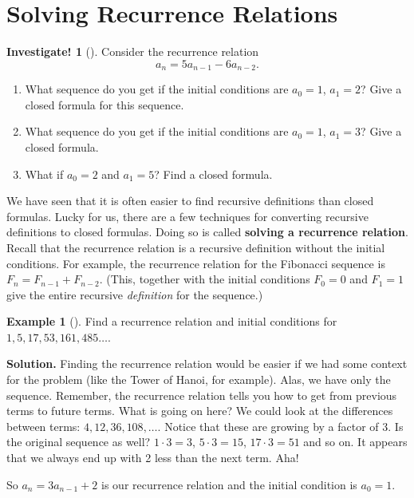\documentclass[12pt,]{book}
\newcommand{\terminology}[1]{\textbf{#1}}
\theoremstyle{plain}
\theoremstyle{definition}
\theoremstyle{definition}
\newtheorem{example}[theorem]{Example}
\theoremstyle{definition}
\newtheorem{investigation}[project]{Investigate!}
\numberwithin{equation}{chapter}
\begin{document}
\section[{Solving Recurrence Relations}]{Solving Recurrence Relations}\label{sec_recurrence}
\begin{investigation}[]\label{investigation-7}
\hypertarget{p-283}{}%
Consider the recurrence relation%
\begin{equation*}
a_n = 5a_{n-1} - 6a_{n-2}.
\end{equation*}
%
\begin{enumerate}
\item\hypertarget{li-177}{}\hypertarget{p-284}{}%
What sequence do you get if the initial conditions are \(a_0 = 1\), \(a_1 = 2\)? Give a closed formula for this sequence.%
\item\hypertarget{li-178}{}\hypertarget{p-285}{}%
What sequence do you get if the initial conditions are \(a_0 = 1\), \(a_1 = 3\)? Give a closed formula.%
\item\hypertarget{li-179}{}\hypertarget{p-286}{}%
What if \(a_0 = 2\) and \(a_1 = 5\)? Find a closed formula.%
\end{enumerate}
%
\end{investigation}
\hypertarget{p-287}{}%
We have seen that it is often easier to find recursive definitions than closed formulas. Lucky for us, there are a few techniques for converting recursive definitions to closed formulas. Doing so is called \terminology{solving a recurrence relation}. Recall that the recurrence relation is a recursive definition without the initial conditions. For example, the recurrence relation for the Fibonacci sequence is \(F_n = F_{n-1} + F_{n-2}\). (This, together with the initial conditions \(F_0 = 0\) and \(F_1 = 1\) give the entire recursive \emph{definition} for the sequence.)%
\begin{example}[]\label{example-18}
\hypertarget{p-288}{}%
Find a recurrence relation and initial conditions for \(1, 5, 17, 53, 161, 485\ldots\).%
\par\smallskip%
\noindent\textbf{Solution.}\hypertarget{solution-32}{}\quad%
\hypertarget{p-289}{}%
Finding the recurrence relation would be easier if we had some context for the problem (like the Tower of Hanoi, for example). Alas, we have only the sequence. Remember, the recurrence relation tells you how to get from previous terms to future terms. What is going on here? We could look at the differences between terms: \(4, 12, 36, 108, \ldots\). Notice that these are growing by a factor of 3. Is the original sequence as well? \(1\cdot 3 = 3\), \(5 \cdot 3 = 15\), \(17 \cdot 3 = 51\) and so on. It appears that we always end up with 2 less than the next term. Aha!%
\par
\hypertarget{p-290}{}%
So \(a_n = 3a_{n-1} + 2\) is our recurrence relation and the initial condition is \(a_0 = 1\).%
\end{example}
\end{document}

